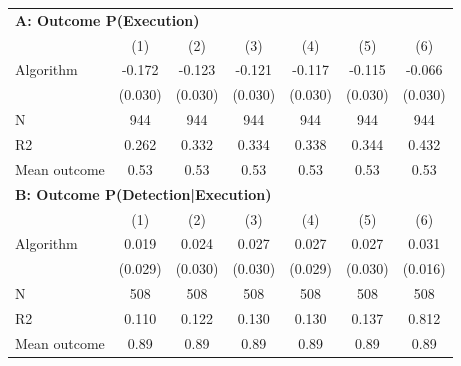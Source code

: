 \begin{tabular}{lcccccc} \toprule
\multicolumn{7}{l}{\textbf{A: Outcome P(Execution)}} \\ \multicolumn{1}{l}{} & (1) & (2) & (3) & (4) & (5) & (6) \\ \midrule
Algorithm   &      -0.172\sym{***}&      -0.123\sym{***}&      -0.121\sym{***}&      -0.117\sym{***}&      -0.115\sym{***}&      -0.066\sym{**} \\
            &     (0.030)         &     (0.030)         &     (0.030)         &     (0.030)         &     (0.030)         &     (0.030)         \\
\midrule
N           &         944         &         944         &         944         &         944         &         944         &         944         \\
R2          &       0.262         &       0.332         &       0.334         &       0.338         &       0.344         &       0.432         \\
Mean outcome&        0.53         &        0.53         &        0.53         &        0.53         &        0.53         &        0.53         \\

\midrule \multicolumn{7}{l}{\textbf{B: Outcome P(Detection|Execution)}} \\ \multicolumn{1}{l}{} & (1) & (2) & (3) & (4) & (5) & (6) \\ \midrule
Algorithm   &       0.019         &       0.024         &       0.027         &       0.027         &       0.027         &       0.031\sym{*}  \\
            &     (0.029)         &     (0.030)         &     (0.030)         &     (0.029)         &     (0.030)         &     (0.016)         \\
\midrule
N           &         508         &         508         &         508         &         508         &         508         &         508         \\
R2          &       0.110         &       0.122         &       0.130         &       0.130         &       0.137         &       0.812         \\
Mean outcome&        0.89         &        0.89         &        0.89         &        0.89         &        0.89         &        0.89         \\


\end{tabular}
